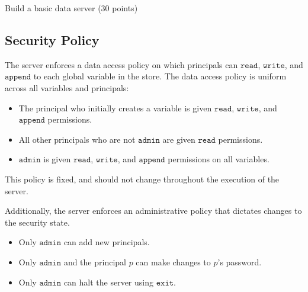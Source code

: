 \documentclass[11pt]{article}
\begin{document}
\begin{problem}{Build a basic data server (30 points)}
\subsection*{Security Policy} The server enforces a data access policy on which principals can $\mathtt{read}$, $\mathtt{write}$, and $\mathtt{append}$ to each global variable in the store. The data access policy is uniform across all variables and principals:
\begin{itemize}
\item The principal who initially creates a variable is given $\mathtt{read}$, $\mathtt{write}$, and $\mathtt{append}$ permissions.
\item All other principals who are not $\mathtt{admin}$ are given $\mathtt{read}$ permissions.
\item $\mathtt{admin}$ is given $\mathtt{read}$, $\mathtt{write}$, and $\mathtt{append}$ permissions on all variables.
\end{itemize}
This policy is fixed, and should not change throughout the execution of the server.

Additionally, the server enforces an administrative policy that dictates changes to the security state.
\begin{itemize}
\item Only $\mathtt{admin}$ can add new principals.
\item Only $\mathtt{admin}$ and the principal $p$ can make changes to $p$'s password.
\item Only $\mathtt{admin}$ can halt the server using $\mathtt{exit}$.
\end{itemize}


\end{problem}
\end{document}
